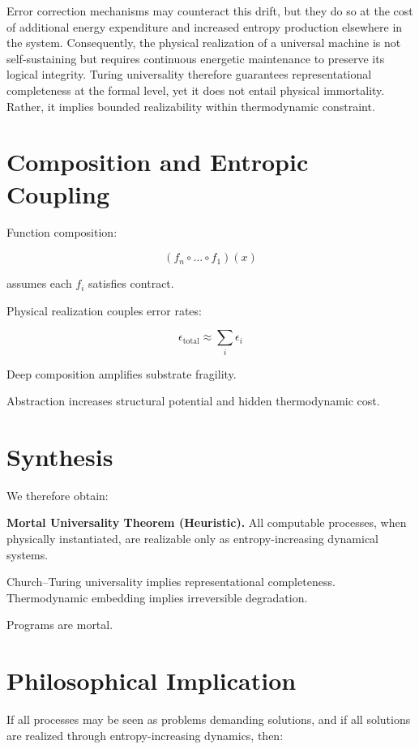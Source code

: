 \documentclass[11pt,openany]{book}
\begin{document}
Error correction mechanisms may counteract this drift, but they do so at the cost 
of additional energy expenditure and increased entropy production elsewhere in 
the system. Consequently, the physical realization of a universal machine is not 
self-sustaining but requires continuous energetic maintenance to preserve its 
logical integrity. Turing universality therefore guarantees representational 
completeness at the formal level, yet it does not entail physical immortality. 
Rather, it implies bounded realizability within thermodynamic constraint.


\section{Composition and Entropic Coupling}

Function composition:

\[
(f_n \circ \dots \circ f_1)(x)
\]

assumes each $f_i$ satisfies contract.

Physical realization couples error rates:

\[
\epsilon_{\text{total}} \approx \sum_i \epsilon_i
\]

Deep composition amplifies substrate fragility.

Abstraction increases structural potential and hidden thermodynamic cost.

\section{Synthesis}

We therefore obtain:

\medskip

\textbf{Mortal Universality Theorem (Heuristic).}
All computable processes, when physically instantiated, 
are realizable only as entropy-increasing dynamical systems.

\medskip

Church--Turing universality implies representational completeness.
Thermodynamic embedding implies irreversible degradation.

Programs are mortal.

\section{Philosophical Implication}

If all processes may be seen as problems demanding solutions,
and if all solutions are realized through entropy-increasing dynamics,
then:
\end{document}
